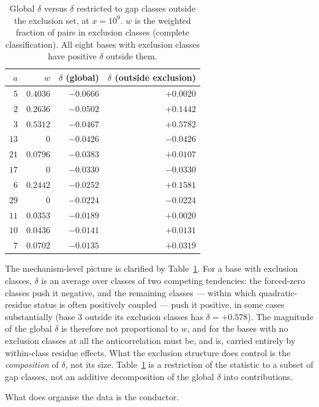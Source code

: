 \documentclass[11pt,reqno]{amsart}
\theoremstyle{plain}
\theoremstyle{definition}
\begin{document}
\begin{table}[t]
\centering
\caption{Global $\delta$ versus $\delta$ restricted to gap classes outside
the exclusion set, at $x = 10^9$. $w$ is the weighted fraction of pairs in
exclusion classes (complete classification). All eight bases with exclusion
classes have positive $\delta$ outside them.}
\label{tab:outside}
\begin{tabular}{rrrr}
\toprule
$a$ & $w$ & $\delta$ (global) & $\delta$ (outside exclusion) \\
\midrule
$5$  & $0.4036$ & $-0.0666$ & $+0.0020$ \\
$2$  & $0.2636$ & $-0.0502$ & $+0.1442$ \\
$3$  & $0.5312$ & $-0.0467$ & $+0.5782$ \\
$13$ & $0$      & $-0.0426$ & $-0.0426$ \\
$21$ & $0.0796$ & $-0.0383$ & $+0.0107$ \\
$17$ & $0$      & $-0.0330$ & $-0.0330$ \\
$6$  & $0.2442$ & $-0.0252$ & $+0.1581$ \\
$29$ & $0$      & $-0.0224$ & $-0.0224$ \\
$11$ & $0.0353$ & $-0.0189$ & $+0.0020$ \\
$10$ & $0.0436$ & $-0.0141$ & $+0.0131$ \\
$7$  & $0.0702$ & $-0.0135$ & $+0.0319$ \\
\bottomrule
\end{tabular}
\end{table}

The mechanism-level picture is clarified by Table~\ref{tab:outside}. For a
base with exclusion classes, $\delta$ is an average over classes of two
competing tendencies: the forced-zero classes push it negative, and the
remaining classes --- within which quadratic-residue status is often positively
coupled --- push it positive, in some cases substantially (base $3$ outside its
exclusion classes has $\delta = +0.578$). The magnitude of the global
$\delta$ is therefore not proportional to $w$, and for the bases with no
exclusion classes at all the anticorrelation must be, and is, carried entirely
by within-class residue effects. What the exclusion structure does control is
the \emph{composition} of $\delta$, not its size. Table~\ref{tab:outside} is a
restriction of the statistic to a subset of gap classes, not an additive
decomposition of the global $\delta$ into contributions.

What does organise the data is the conductor.
\end{document}
